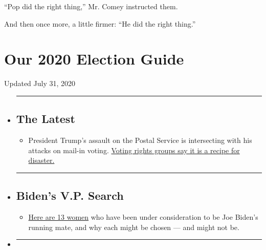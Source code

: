 ``Pop did the right thing,'' Mr. Comey instructed them.

And then once more, a little firmer: ``He did the right thing.''

\hypertarget{our-2020-election-guide}{%
\section{Our 2020 Election Guide}\label{our-2020-election-guide}}

Updated July 31, 2020

\begin{itemize}
\item
  \begin{center}\rule{0.5\linewidth}{\linethickness}\end{center}

  \hypertarget{the-latest}{%
  \subsection{The Latest}\label{the-latest}}

  \begin{itemize}
  \tightlist
  \item
    President Trump's assault on the Postal Service is intersecting with
    his attacks on mail-in voting.
    \href{https://www.nytimes.com/2020/07/31/us/politics/trump-usps-mail-delays.html?action=click\&pgtype=Article\&state=default\&region=BELOW_MAIN_CONTENT\&context=storylines_guide}{Voting
    rights groups say it is a recipe for disaster.}
  \end{itemize}
\item
  \begin{center}\rule{0.5\linewidth}{\linethickness}\end{center}

  \hypertarget{bidens-vp-search}{%
  \subsection{Biden's V.P. Search}\label{bidens-vp-search}}

  \begin{itemize}
  \tightlist
  \item
    \href{https://www.nytimes.com/article/biden-vice-president-2020.html?action=click\&pgtype=Article\&state=default\&region=BELOW_MAIN_CONTENT\&context=storylines_guide}{Here
    are 13 women} who have been under consideration to be Joe Biden's
    running mate, and why each might be chosen --- and might not be.
  \end{itemize}
\item
  \begin{center}\rule{0.5\linewidth}{\linethickness}\end{center}


\end{itemize}
